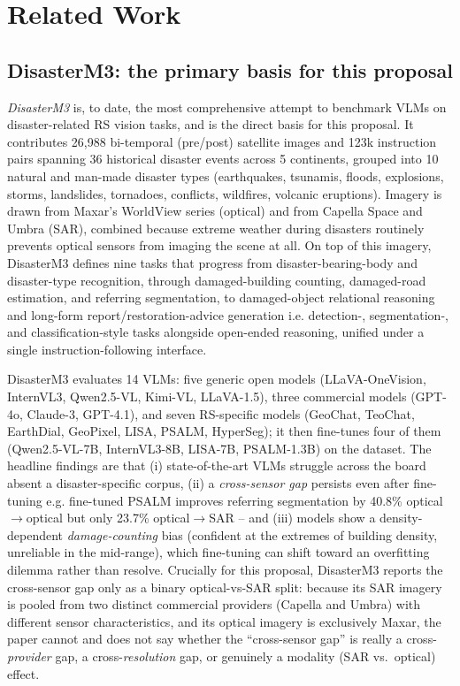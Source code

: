 \section{Related Work}
\label{sec:related-work}

\subsection{DisasterM3: the primary basis for this proposal}
\label{sec:related-disasterm3}

\emph{DisasterM3}  is, to date, the most comprehensive
attempt to benchmark VLMs on disaster-related RS vision tasks, and is the
direct basis for this proposal. It contributes 26,988 bi-temporal (pre/post)
satellite images and 123k instruction pairs spanning 36 historical disaster
events across 5 continents, grouped into 10 natural and man-made disaster
types (earthquakes, tsunamis, floods, explosions, storms, landslides,
tornadoes, conflicts, wildfires, volcanic eruptions). Imagery is drawn from
Maxar's WorldView series (optical) and from Capella Space and Umbra (SAR),
combined because extreme weather during disasters routinely prevents optical
sensors from imaging the scene at all. On top of this imagery, DisasterM3
defines nine tasks that progress from disaster-bearing-body and disaster-type
recognition, through damaged-building counting, damaged-road estimation, and
referring segmentation, to damaged-object relational reasoning and long-form
report/restoration-advice generation i.e. detection-, segmentation-, and
classification-style tasks alongside open-ended reasoning, unified under a
single instruction-following interface.

DisasterM3 evaluates 14 VLMs: five generic open models (LLaVA-OneVision,
InternVL3, Qwen2.5-VL, Kimi-VL, LLaVA-1.5), three commercial models (GPT-4o,
Claude-3, GPT-4.1), and seven RS-specific models (GeoChat, TeoChat, EarthDial,
GeoPixel, LISA, PSALM, HyperSeg); it then fine-tunes four of them
(Qwen2.5-VL-7B, InternVL3-8B, LISA-7B, PSALM-1.3B) on the dataset. The
headline findings are that (i) state-of-the-art VLMs struggle across the
board absent a disaster-specific corpus, (ii) a \emph{cross-sensor gap}
persists even after fine-tuning e.g. fine-tuned PSALM improves referring
segmentation by 40.8\% optical$\to$optical but only 23.7\% optical$\to$SAR --
and (iii) models show a density-dependent \emph{damage-counting} bias
(confident at the extremes of building density, unreliable in the mid-range),
which fine-tuning can shift toward an overfitting dilemma rather than resolve.
Crucially for this proposal, DisasterM3 reports the cross-sensor gap only as
a binary optical-vs-SAR split: because its SAR imagery is pooled from two
distinct commercial providers (Capella and Umbra) with different sensor
characteristics, and its optical imagery is exclusively Maxar, the paper
cannot and does not say whether the ``cross-sensor gap'' is really a
cross-\emph{provider} gap, a cross-\emph{resolution} gap, or genuinely a
modality (SAR vs.\ optical) effect.

